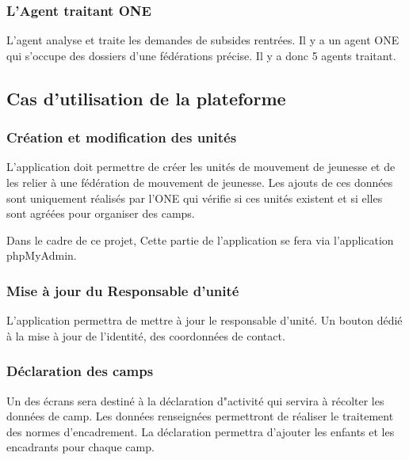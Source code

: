 
\subsubsection{L'Agent traitant ONE}
L'agent analyse et traite les demandes de subsides rentrées. Il y a un agent ONE qui s'occupe des dossiers d'une fédérations précise. Il y a donc 5 agents traitant. 

\subsection{Cas d'utilisation de la plateforme}

\subsubsection{Création et modification des unités}
L'application doit permettre de créer les unités de mouvement de jeunesse et de les relier à une fédération de mouvement de jeunesse. Les ajouts de ces données sont uniquement réalisés par l'ONE qui vérifie si ces unités existent et si elles sont agréées pour organiser des camps. 

Dans le cadre de ce projet, Cette partie de l'application se fera via l'application phpMyAdmin. 


\subsubsection{Mise à jour du Responsable d'unité}
L'application permettra de mettre à jour le responsable d'unité. Un bouton dédié à la mise à jour de l'identité, des coordonnées de contact. 



\subsubsection{Déclaration des camps}
Un des écrans sera destiné à la déclaration d"activité qui servira à récolter les données de camp. Les données renseignées permettront de réaliser le traitement des normes d'encadrement. 
La déclaration permettra d'ajouter les enfants et les encadrants pour chaque camp. 

